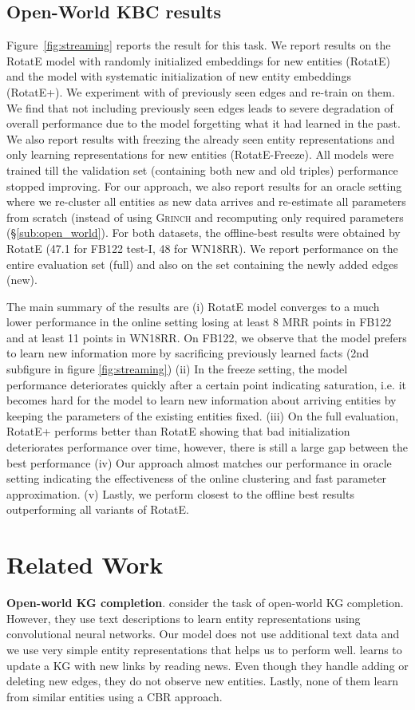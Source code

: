 \documentclass[11pt,a4paper]{article}
\newcommand{\fb}{FB122\xspace}
\newcommand{\wn}{WN18RR\xspace}
\newcommand{\grinch}{\textsc{Grinch}\xspace}
\begin{document}
\subsection{Open-World KBC results}
\label{sub:online}
Figure~\ref{fig:streaming} reports the result for this task. We report results on the RotatE model with randomly initialized embeddings for new entities (RotatE) and the model with systematic initialization of new entity embeddings (RotatE+). We experiment with   of previously seen edges and re-train on them. We find that not including previously seen edges leads to severe degradation of overall performance due to the model forgetting what it had learned in the past. We also report results with freezing the already seen entity representations and only learning representations for new entities (RotatE-Freeze). All models were trained till the validation set (containing both new and old triples) performance stopped improving. For our approach, we also report results for an oracle setting where we re-cluster all entities as new data arrives and re-estimate all parameters from scratch (instead of using \grinch and recomputing only required parameters (\S\ref{sub:open_world}). For both datasets, the offline-best results were obtained by RotatE (47.1 for \fb test-I, 48 for \wn). We report performance on the entire evaluation set (full) and also on the set containing the newly added edges (new).

The main summary of the results are (i) RotatE model converges to a much lower performance in the online setting losing at least 8 MRR points in \fb and at least 11 points in \wn. On \fb, we observe that the model prefers to learn new information more by sacrificing previously learned facts (2nd subfigure in figure \ref{fig:streaming}) (ii) In the freeze setting, the model performance deteriorates quickly after a certain point indicating saturation, i.e. it becomes hard for the model to learn new information about arriving entities by keeping the parameters of the existing entities fixed. (iii) On the full evaluation, RotatE+ performs better than RotatE showing that bad initialization deteriorates performance over time, however, there is still a large gap between the best performance (iv) Our approach almost matches our performance in oracle setting indicating the effectiveness of the online clustering and fast parameter approximation. (v) Lastly, we perform closest to the offline best results outperforming all variants of RotatE. \section{Related Work}
\label{sec:related_work}
\noindent\textbf{Open-world KG completion}. \citet{shi2018open} consider the task of open-world KG completion. However, they use text descriptions to learn entity representations using convolutional neural networks. Our model does not use additional text data and we use very simple entity representations that helps us to perform well. \citet{tang2019learning} learns to update a KG with new links by reading news. Even though they handle adding or deleting new edges, they do not observe new entities. Lastly, none of them learn from similar entities using a CBR approach.
\end{document}
